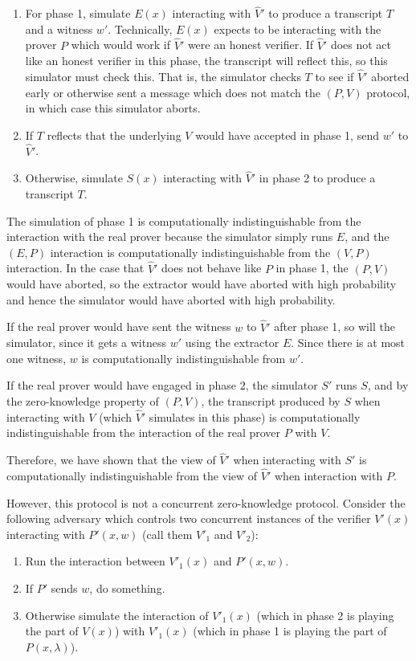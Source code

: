 \documentclass[draft]{article}
\begin{document}
\begin{enumerate}
\begin{description}
\begin{enumerate}
    \item
      For phase 1, simulate $E(x)$ interacting with $\hat{V}'$ to produce a transcript $T$ and a witness $w'$.
      Technically, $E(x)$ expects to be interacting with the prover $P$ which would work if $\hat{V}'$ were an honest verifier.
      If $\hat{V}'$ does not act like an honest verifier in this phase, the transcript will reflect this, so this simulator must check this.
      That is, the simulator checks $T$ to see if $\hat{V}'$ aborted early or otherwise sent a message which does not match the $(P, V)$ protocol, in which case this simulator aborts.
    \item If $T$ reflects that the underlying $V$ would have accepted in phase 1, send $w'$ to $\hat{V}'$.
    \item Otherwise, simulate $S(x)$ interacting with $\hat{V}'$ in phase 2 to produce a transcript $T$.
    \end{enumerate}

    The simulation of phase 1 is computationally indistinguishable from the interaction with the real prover because the simulator simply runs $E$, and the $(E, P)$ interaction is computationally indistinguishable from the $(V, P)$ interaction.
    In the case that $\hat{V}'$ does not behave like $P$ in phase 1, the $(P, V)$ would have aborted, so the extractor would have aborted with high probability and hence the simulator would have aborted with high probability.

    If the real prover would have sent the witness $w$ to $\hat{V}'$ after phase 1, so will the simulator, since it gets a witness $w'$ using the extractor $E$.
    Since there is at most one witness, $w$ is computationally indistinguishable from $w'$.
    
    If the real prover would have engaged in phase 2, the simulator $S'$ runs $S$, and by the zero-knowledge property of $(P, V)$, the transcript produced by $S$ when interacting with $V$ (which $\hat{V}'$ simulates in this phase) is computationally indistinguishable from the interaction of the real prover $P$ with $V$.

    Therefore, we have shown that the view of $\hat{V}'$ when interacting with $S'$ is computationally indistinguishable from the view of $\hat{V}'$ when interaction with $P$.
  \end{description}

  However, this protocol is not a concurrent zero-knowledge protocol.
  Consider the following adversary which controls two concurrent instances of the verifier $V'(x)$ interacting with $P'(x, w)$ (call them $V'_1$ and $V'_2$):
  \begin{enumerate}
  \item Run the interaction between $V'_1(x)$ and $P'(x, w)$.
  \item If $P'$ sends $w$, do something.
  \item Otherwise simulate the interaction of $V'_1(x)$ (which in phase 2 is playing the part of $V(x)$) with $V'_1(x)$ (which in phase 1 is playing the part of $P(x, \lambda)$).
  \end{enumerate}
\end{enumerate}
\end{document}

